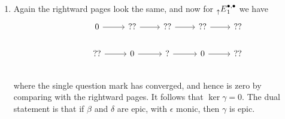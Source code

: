 \documentclass{report}
\begin{document}
\begin{enumerate}[label=\textbf{1.7.\Alph*.}]
	\item Again the rightward pages look the same, and now for
	      $\prescript{}{\uparrow}E^{\bullet,\bullet}_1$ we have
	      \begin{equation*}
		      \begin{tikzcd}
			      &0 \ar[r] &?? \ar[r] &?? \ar[r] &?? \ar[r] &?? \\
			      &?? \ar[r] &0 \ar[r] &? \ar[r] &0 \ar[r] &?? \\
		      \end{tikzcd}
	      \end{equation*}
	      where the single question mark has converged, and hence is zero by
	      comparing with the rightward pages. It follows that $\ker\gamma=0$.
	      The dual statement is that if $\beta$ and $\delta$ are epic, with
	      $\epsilon$ monic, then $\gamma$ is epic.


\end{enumerate}
\end{document}
